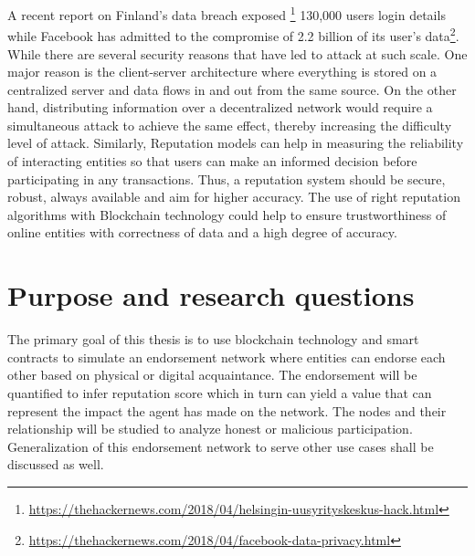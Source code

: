 A recent report on Finland's data breach exposed
\footnote{\url{https://thehackernews.com/2018/04/helsingin-uusyrityskeskus-hack.html}}
130,000 users login details while Facebook has admitted to the compromise of
2.2 billion of its user's
data\footnote{\url{https://thehackernews.com/2018/04/facebook-data-privacy.html}}.
While there are several security reasons that have led to attack at such scale.
One major reason is the client-server architecture where everything is stored
on a centralized server and data flows in and out from the same source. On the
other hand, distributing information over a decentralized network would require
a simultaneous attack to achieve the same effect, thereby increasing the
difficulty level of attack. Similarly, Reputation models can help in measuring
the reliability of interacting entities so that users can make an informed
decision before participating in any transactions. Thus, a reputation system
should be secure, robust, always available and aim for higher accuracy. The use
of right reputation algorithms with Blockchain technology could help to ensure
trustworthiness of online entities with correctness of data and a high degree
of accuracy.  


\section{Purpose and research questions} \label{ResearchQuestions}

The primary goal of this thesis is to use blockchain technology and smart
contracts to simulate an endorsement network where entities can endorse each
other based on physical or digital acquaintance. The endorsement will be
quantified to infer reputation score which in turn can yield a value that can
represent the impact the agent has made on the network.  The nodes and their
relationship will be studied to analyze honest or malicious participation.
Generalization of this endorsement network to serve other use cases shall be
discussed as well. 

